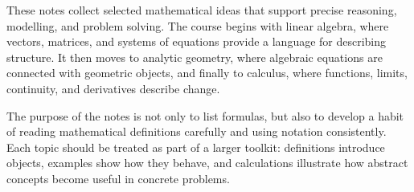 These notes collect selected mathematical ideas that support precise reasoning, modelling, and problem solving. The course begins with linear algebra, where vectors, matrices, and systems of equations provide a language for describing structure. It then moves to analytic geometry, where algebraic equations are connected with geometric objects, and finally to calculus, where functions, limits, continuity, and derivatives describe change.

The purpose of the notes is not only to list formulas, but also to develop a habit of reading mathematical definitions carefully and using notation consistently. Each topic should be treated as part of a larger toolkit: definitions introduce objects, examples show how they behave, and calculations illustrate how abstract concepts become useful in concrete problems.
